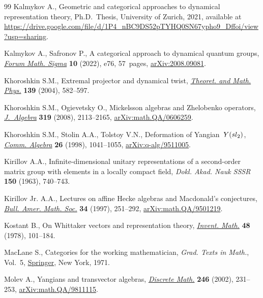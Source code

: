 \documentclass[10pt,a4paper]{article}
\numberwithin{equation}{section}
\begin{document}
\begin{thebibliography}{99}
Kalmykov A., Geometric and categorical approaches to dynamical representation theory, Ph.D.~Thesis, {U}niversity of Zurich, 2021, available at
 \url{https://drive.google.com/file/d/1P4_nBC9DS52pTYHQ0SN67ypho9_Dffoi/view?usp=sharing}.

Kalmykov A., Safronov P., A categorical approach to dynamical quantum groups,
 \href{https://doi.org/10.1017/fms.2022.68}{\textit{Forum Math. Sigma}} \textbf{10} (2022), e76, 57~pages,
 \href{https://arxiv.org/abs/2008.09081}{arXiv:2008.09081}.

Khoroshkin S.M., Extremal projector and dynamical twist, \href{https://doi.org/10.1023/B:TAMP.0000022749.42512.fd}{\textit{Theoret. and
 Math. Phys.}} \textbf{139} (2004), 582--597.

Khoroshkin S.M., Ogievetsky O., Mickelsson algebras and {Z}helobenko operators,
  \href{https://doi.org/10.1016/j.jalgebra.2007.04.020}{\textit{J.~Algebra}} \textbf{319} (2008), 2113--2165,
 \href{https://arxiv.org/abs/math.QA/0606259}{arXiv:math.QA/0606259}.

Khoroshkin S.M., Stolin A.A., Tolstoy V.N., Deformation of {Y}angian~{$Y({\rm
 sl}_2)$}, \href{https://doi.org/10.1080/00927879808826182}{\textit{Comm. Algebra}} \textbf{26} (1998), 1041--1055,
 \href{https://arxiv.org/abs/q-alg/9511005}{arXiv:q-alg/9511005}.

Kirillov A.A., Infinite-dimensional unitary representations of a second-order
 matrix group with elements in a locally compact field, \textit{Dokl. Akad.
 Nauk SSSR} \textbf{150} (1963), 740--743.

Kirillov Jr. A.A., Lectures on affine {H}ecke algebras and {M}acdonald's
 conjectures, \href{https://doi.org/10.1090/S0273-0979-97-00727-1}{\textit{Bull. Amer. Math. Soc.}} \textbf{34} (1997), 251--292,
 \href{https://arxiv.org/abs/math.QA/9501219}{arXiv:math.QA/9501219}.

Kostant B., On {W}hittaker vectors and representation theory, \href{https://doi.org/10.1007/BF01390249}{\textit{Invent.
 Math.}} \textbf{48} (1978), 101--184.

MacLane S., Categories for the working mathematician, \textit{Grad. Texts in
 Math.}, Vol.~5, \href{https://doi.org/10.1007/978-1-4757-4721-8}{Springer}, New York, 1971.

Molev A., Yangians and transvector algebras, \href{https://doi.org/10.1016/S0012-365X(01)00260-6}{\textit{Discrete Math.}} \textbf{246} (2002), 231--253,
 \href{https://arxiv.org/abs/math.QA/9811115}{arXiv:math.QA/9811115}.


\end{thebibliography}
\end{document}
